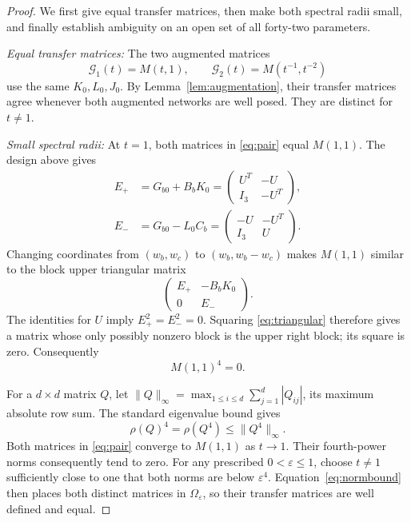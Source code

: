 \documentclass[letterpaper,10pt,conference]{ieeeconf}
\begin{document}
\begin{proof}
We first give equal transfer matrices, then make both spectral radii small,
and finally establish ambiguity on an open set of all forty-two
parameters.

\emph{Equal transfer matrices:}
The two augmented matrices
\begin{equation}\label{eq:pair}
 \mathcal G_1(t)=M(t,1),\qquad
 \mathcal G_2(t)=M(t^{-1},t^{-2})
\end{equation}
use the same \(K_0,L_0,J_0\). By Lemma~\ref{lem:augmentation}, their
transfer matrices agree whenever both augmented networks are well posed.
They are distinct for \(t\ne1\).

\emph{Small spectral radii:}
At \(t=1\), both matrices in \eqref{eq:pair} equal \(M(1,1)\).
The design above gives
\begin{equation}\label{eq:nilblocks}
\begin{split}
 E_+&=G_{b0}+B_bK_0
       =\begin{pmatrix}U^T&-U\\I_3&-U^T\end{pmatrix},\\
 E_-&=G_{b0}-L_0C_b
       =\begin{pmatrix}-U&-U^T\\I_3&U\end{pmatrix}.
\end{split}
\end{equation}
Changing coordinates from \((w_b,w_c)\) to \((w_b,w_b-w_c)\) makes
\(M(1,1)\) similar to the block upper triangular matrix
\begin{equation}\label{eq:triangular}
 \begin{pmatrix}E_+&-B_bK_0\\0&E_-\end{pmatrix}.
\end{equation}
The identities for \(U\) imply \(E_+^2=E_-^2=0\).
Squaring \eqref{eq:triangular} therefore gives a matrix whose only
possibly nonzero block is the upper right block; its square is zero.
Consequently
\begin{equation}\label{eq:nilpotent}
 M(1,1)^4=0.
\end{equation}

For a \(d\times d\) matrix \(Q\), let
\(\|Q\|_\infty=\max_{1\le i\le d}\sum_{j=1}^d|Q_{ij}|\), its maximum
absolute row sum.
The standard eigenvalue bound gives
\begin{equation}\label{eq:normbound}
 \rho(Q)^4=\rho(Q^4)\le\|Q^4\|_\infty.
\end{equation}
Both matrices in \eqref{eq:pair} converge to \(M(1,1)\) as \(t\to1\).
Their fourth-power norms consequently tend to zero.
For any prescribed \(0<\varepsilon\le1\), choose \(t\ne1\)
sufficiently close to one that both norms are below \(\varepsilon^4\).
Equation~\eqref{eq:normbound} then places both distinct matrices in
\(\Omega_\varepsilon\), so their transfer matrices are well defined and equal.


\end{proof}
\end{document}
